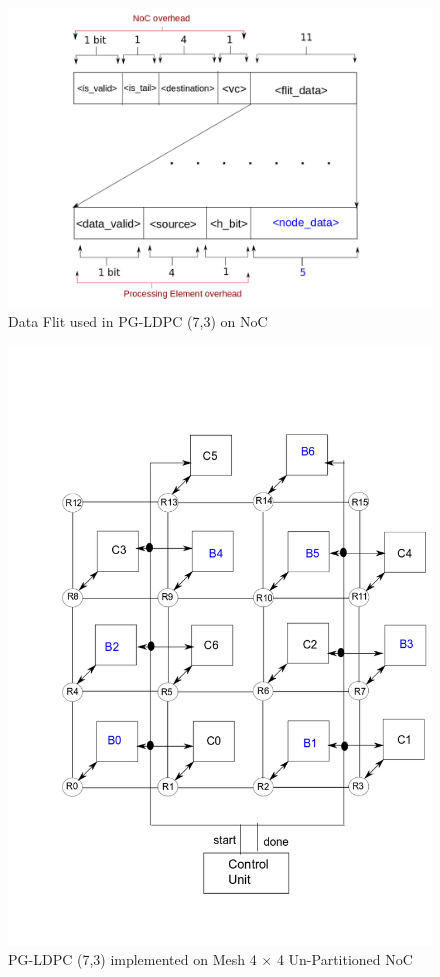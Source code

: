 \begin{figure} [H]
  \centering
   \includegraphics[scale=0.3]{./figs/flit_structure_ldpc_7x7}
  \caption{Data Flit used in PG-LDPC (7,3) on NoC}
  \label{flit_structure_ldpc_7x7}
\end{figure}

 \begin{figure} [H]
  \centering
   \includegraphics[scale=0.3]{./figs/ldpc_7x7_NoC_mesh_4x4}
  \caption{PG-LDPC (7,3) implemented on Mesh 4 $\times$ 4 Un-Partitioned NoC}
  \label{ldpc_7x7_NoC_mesh_4x4}
\end{figure}

